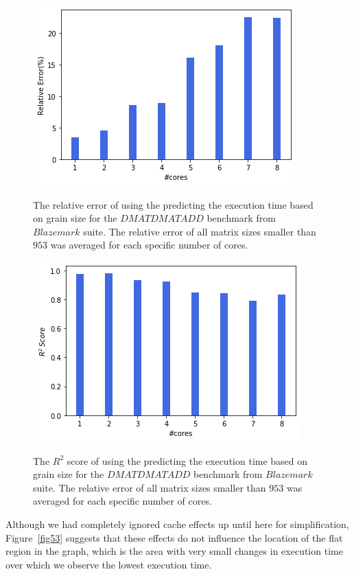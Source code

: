 \begin{figure}[H]
	\centering
	{\includegraphics[scale=.45]{images/hpx_for_loop/blazemark/marvin_relative_error_less_953.png}}
	\caption{The relative error of using the predicting the execution time based on grain size for the $DMATDMATADD$ benchmark from $Blazemark$ suite. The relative error of all matrix sizes smaller than $953$ was averaged for each specific number of cores.}\label{fig54}		
\end{figure}

\begin{figure}[H]
	\centering
	{\includegraphics[scale=.45]{images/hpx_for_loop/blazemark/marvin_r2_error_less_953.png}}
	\caption{The $R^2$ score of using the predicting the execution time based on grain size for the $DMATDMATADD$ benchmark from $Blazemark$ suite. The relative error of all matrix sizes smaller than $953$ was averaged for each specific number of cores.}\label{fig55}		
\end{figure}

Although we had completely ignored cache effects up until here for simplification, Figure~\ref{fig53} suggests that these effects do not influence the location of the flat region in the graph, which is the area with very small changes in execution time over which we observe the lowest execution time.   

